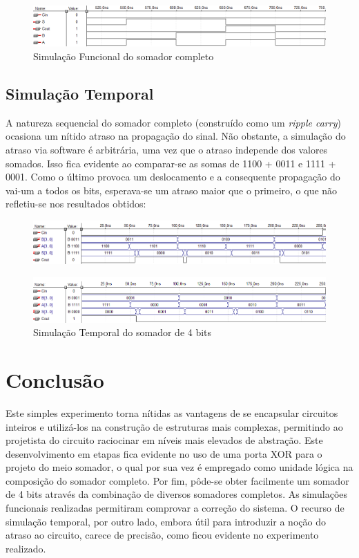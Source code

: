 \documentclass[a4paper]{article}
\begin{document}
\begin{figure}[h]
  \centering
  \includegraphics[scale=0.3]{sim_func_4bit_adder.png}
  \caption{Simulação Funcional do somador completo}
\end{figure}



\FloatBarrier
\subsection{Simulação Temporal}
	A natureza sequencial do somador completo (construído como um \emph{ripple
carry}) ocasiona um nítido atraso na propagação do sinal. Não obstante, a
simulação do atraso via software é arbitrária, uma vez que o atraso independe
dos valores somados. Isso fica evidente ao comparar-se as somas de 1100 + 0011
e 1111 + 0001. Como o último provoca um deslocamento e a consequente propagação
do vai-um a todos os bits, esperava-se um atraso maior que o primeiro, o que
não refletiu-se nos resultados obtidos:

\begin{figure}[h]
  \centering
  \includegraphics[scale=0.4]{sim_temp_4bit-1.png}
\end{figure}

\begin{figure}[h]
  \centering
  \includegraphics[scale=0.4]{sim_temp_4bit-2.png}
  \caption{Simulação Temporal do somador de 4 bits}
\end{figure}


\FloatBarrier
\section{Conclusão}
	Este simples experimento torna nítidas as vantagens de se encapsular 
circuitos inteiros e utilizá-los na construção de estruturas mais complexas,
permitindo ao projetista do circuito raciocinar em níveis mais elevados de
abstração. Este desenvolvimento em etapas fica evidente no uso de uma porta
XOR para o projeto do meio somador, o qual por sua vez é empregado como unidade
lógica na composição do somador completo. Por fim, pôde-se obter facilmente
um somador de 4 bits através da combinação de diversos somadores completos.
	As simulações funcionais realizadas permitiram comprovar a correção do sistema.
O recurso de simulação temporal, por outro lado, embora útil para introduzir
a noção do atraso ao circuito, carece de precisão, como ficou evidente no experimento
realizado.
\end{document}
